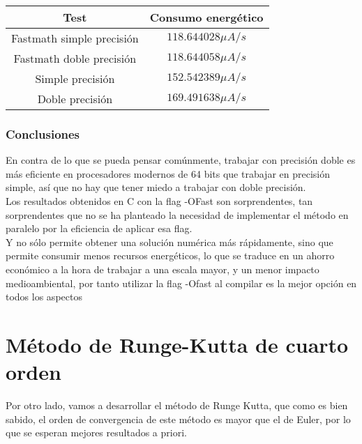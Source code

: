 \begin{ejemplo}
\begin{table}[H]
	\centering
	\begin{tabular}{|c|c|}
		\hline
		\textbf{Test}  & \textbf{Consumo energético}        \\ \hline
		Fastmath simple precisión & $118.644028 \mu A/s$ \\ 
		Fastmath doble precisión  & $118.644058 \mu A/s$ \\
		Simple precisión & $ 152.542389 \mu A/s$ \\
		Doble precisión & $ 169.491638 \mu A/s$ \\
		\hline
	\end{tabular}%
\end{table}
\subsubsection{Conclusiones}
En contra de lo que se pueda pensar comúnmente, trabajar con precisión doble es más eficiente en procesadores modernos de 64 bits que trabajar en precisión simple, así que no hay que tener miedo a trabajar con doble precisión. \\
Los resultados obtenidos en C con la flag -OFast son sorprendentes, tan sorprendentes que no se ha planteado la necesidad  de implementar el método en paralelo por la eficiencia de aplicar esa flag.
\\
Y no sólo permite obtener una solución numérica más rápidamente, sino que permite consumir menos recursos energéticos, lo que se traduce en un ahorro económico a la hora de trabajar a una escala mayor, y un menor impacto medioambiental, por tanto utilizar la flag -Ofast al compilar es la mejor opción en todos los aspectos
\end{ejemplo}

\section{Método de Runge-Kutta de cuarto orden}
Por otro lado, vamos a desarrollar el método de Runge Kutta, que como es bien sabido, el orden de convergencia de este método es mayor que el de Euler, por lo que se esperan mejores resultados a priori.

